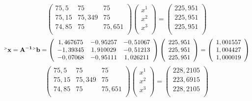 \documentclass[12pt]{article}
\begin{document}
\begin{equation*}
	\left(
	\begin{array}{ccc}
		75,5 & 75 & 75\\
		75,15 & 75,349 & 75 \\
		74,85 & 75 & 75,651 \\
	\end{array}
	\right)
	\left(
	\begin{array}{c}
		x^1\\
		x^2 \\
		x^3 \\
	\end{array}
	\right)
	=
	\left(
	\begin{array}{c}
		225,951\\
		225,951\\
		225,951\\
	\end{array}
	\right)
\end{equation*}
\begin{equation*}
	\mathbf{^{\mathsmaller{>}} x=A^{-1} {}^\mathsmaller{>}b} = 
	\left(
	\begin{array}{ccc}
		1,467675 & -0,95257 & -0,51067 \\
		-1,39345 & 1,910029 & -0,51213 \\
		-0,07068 & -0,95111	& 1,026211 \\
	\end{array}
	\right)
	\left(
	\begin{array}{c}
		225,951\\
		225,951\\
		225,951\\
	\end{array}
	\right)
	=
	\left(
	\begin{array}{c}
		1,001557\\
		1,004427\\
		1,000019\\
	\end{array}
	\right)
\end{equation*}
\begin{equation*}
\left(
\begin{array}{ccc}
	75,5 & 75 & 75\\
	75,15 & 75,349 & 75 \\
	74,85 & 75 & 75,651 \\
\end{array}
\right)
	\left(
	\begin{array}{c}
		x^1\\
		x^2 \\
		x^3 \\
	\end{array}
	\right)
	=
	\left(
	\begin{array}{c}
		228,2105\\
		223,6915\\
		228,2105\\
	\end{array}
	\right)
\end{equation*}
\end{document}
